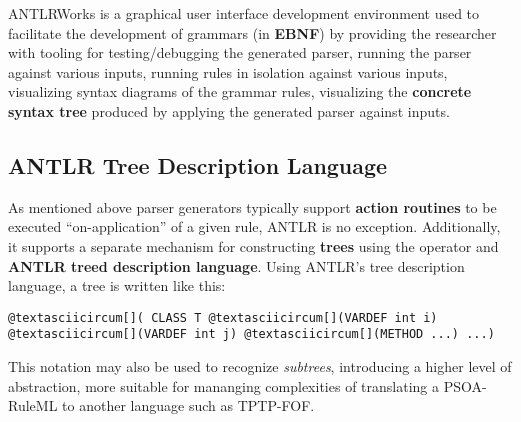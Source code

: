 \documentclass[letterpaper,10pt,english]{sphinxmanual}
\begin{document}
ANTLRWorks is a graphical user interface development environment used to
facilitate the development of grammars (in \textbf{EBNF}) by providing the researcher
with tooling for testing/debugging the generated parser, running the parser
against various inputs, running rules in isolation against various inputs,
visualizing syntax diagrams of the grammar rules, visualizing the \textbf{concrete
syntax tree} produced by applying the generated parser against inputs.


\subsection{ANTLR Tree Description Language}
\label{project-proposal/index:antlr-tree-description-language}
As mentioned above parser generators typically support \textbf{action routines} to be
executed ``on-application'' of a given rule, ANTLR is no exception.  Additionally,
it supports a separate mechanism for constructing \textbf{trees} using the \code{-\textgreater{}}
operator and \textbf{ANTLR treed description language}.  Using ANTLR’s tree
description language, a tree is written like this:

\begin{Verbatim}[commandchars=@\[\]]
@textasciicircum[]( CLASS T @textasciicircum[](VARDEF int i) @textasciicircum[](VARDEF int j) @textasciicircum[](METHOD ...) ...)
\end{Verbatim}

This notation may also be used to recognize \emph{subtrees}, introducing a higher
level of abstraction, more suitable for mananging complexities of translating a
PSOA-RuleML to another language such as TPTP-FOF.
\end{document}
